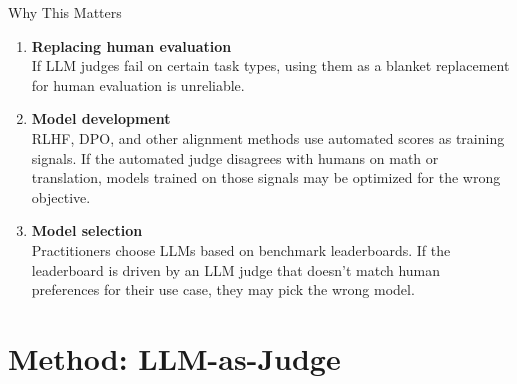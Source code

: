 \documentclass[aspectratio=169,11pt]{beamer}
\begin{document}
\begin{frame}{Why This Matters}

\begin{enumerate}
    \item \textbf{Replacing human evaluation}\\
    If LLM judges fail on certain task types, using them as a blanket replacement for human evaluation is unreliable.

    \vspace{0.5em}
    \item \textbf{Model development}\\
    RLHF, DPO, and other alignment methods use automated scores as training signals. If the automated judge disagrees with humans on math or translation, models trained on those signals may be optimized for the wrong objective.

    \vspace{0.5em}
    \item \textbf{Model selection}\\
    Practitioners choose LLMs based on benchmark leaderboards. If the leaderboard is driven by an LLM judge that doesn't match human preferences for their use case, they may pick the wrong model.
\end{enumerate}
\end{frame}

\section{Method: LLM-as-Judge}
\end{document}
